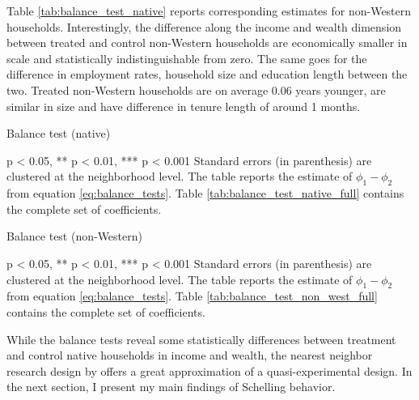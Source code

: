 \documentclass[main.tex]{subfiles}
\begin{document}
Table \ref{tab:balance_test_native} reports corresponding estimates for non-Western households. Interestingly, the difference along the income and wealth dimension between treated and control non-Western households are economically smaller in scale and statistically indistinguishable from zero. The same goes for the difference in employment rates, household size and education length between the two. Treated non-Western households are on average 0.06 years younger, are similar in size and have difference in tenure length of around 1 months. 


\begin{table}[H]
    \centering
    \caption{Balance test (native)}
    \resizebox{\textwidth}{!}{}
    \label{tab:balance_test_native}
    \begin{tablenotes}[flushleft]
\item \scriptsize * p < 0.05, ** p < 0.01, *** p < 0.001 Standard errors (in parenthesis) are clustered at the neighborhood level. The table reports the estimate of $\phi_1 - \phi_2$ from equation \ref{eq:balance_tests}. Table \ref{tab:balance_test_native_full} contains the complete set of coefficients.
\end{tablenotes}
\end{table}

\begin{table}[H]
    \centering
    \caption{Balance test (non-Western)}
    \resizebox{\textwidth}{!}{}
    \label{tab:balance_test_non_west}
    \begin{tablenotes}[flushleft]
\item \scriptsize * p < 0.05, ** p < 0.01, *** p < 0.001 Standard errors (in parenthesis) are clustered at the neighborhood level. The table reports the estimate of $\phi_1 - \phi_2$ from equation \ref{eq:balance_tests}. Table \ref{tab:balance_test_non_west_full} contains the complete set of coefficients.
\end{tablenotes}
\end{table}
While the balance tests reveal some statistically differences between treatment and control native households in income and wealth, the nearest neighbor research design by \textcite{Bayer_2022_nearest_neighbor} offers a great approximation of a quasi-experimental design. In the next section, I present my main findings of Schelling behavior.
\end{document}
